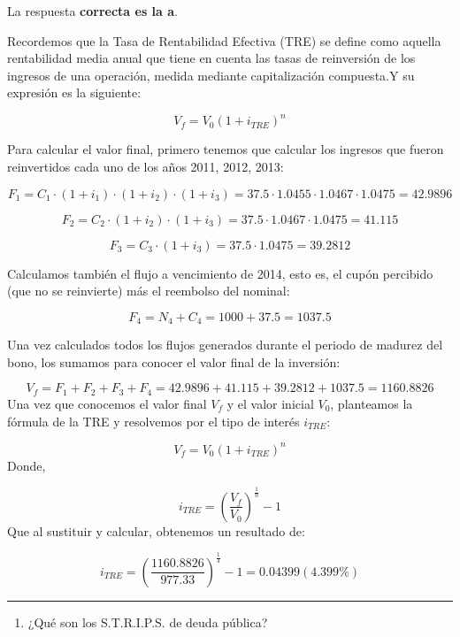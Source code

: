 \documentclass[
  letterpaper,
  DIV=11,
  numbers=noendperiod]{scrreprt}
\providecommand{\tightlist}{%
  \setlength{\itemsep}{0pt}\setlength{\parskip}{0pt}}\usepackage{longtable,booktabs,array}
\begin{document}
\begin{tcolorbox}
\begin{tcolorbox}[enhanced jigsaw, toprule=.15mm, left=2mm, arc=.35mm, breakable, bottomrule=.15mm, opacityback=0, rightrule=.15mm, leftrule=.75mm, colframe=quarto-callout-note-color-frame, colback=white]
\begin{minipage}[t]{\textwidth - 5.5mm}
La respuesta \textbf{correcta es la a}.

Recordemos que la Tasa de Rentabilidad Efectiva (TRE) se define como
aquella rentabilidad media anual que tiene en cuenta las tasas de
reinversión de los ingresos de una operación, medida mediante
capitalización compuesta.Y su expresión es la siguiente:

\[V_f=V_0\left(1+i_{TRE}\right)^n\]

Para calcular el valor final, primero tenemos que calcular los ingresos
que fueron reinvertidos cada uno de los años 2011, 2012, 2013:

\[F_1=C_1\cdot\left(1+i_1\right)\cdot\left(1+i_2\right)\cdot\left(1+i_3\right)=37.5\cdot1.0455\cdot1.0467\cdot1.0475=42.9896\]

\[F_2=C_2\cdot\left(1+i_2\right)\cdot\left(1+i_3\right)=37.5\cdot1.0467\cdot1.0475=41.115\]

\[F_3=C_3\cdot\left(1+i_3\right)=37.5\cdot1.0475=39.2812\]

Calculamos también el flujo a vencimiento de 2014, esto es, el cupón
percibido (que no se reinvierte) más el reembolso del nominal:

\[F_4=N_4+C_4=1000+37.5=1037.5\]

Una vez calculados todos los flujos generados durante el periodo de
madurez del bono, los sumamos para conocer el valor final de la
inversión:

\[V_f=F_1+F_2+F_3+F_4=42.9896+41.115+39.2812+1037.5=1160.8826\] Una vez
que conocemos el valor final \(V_f\) y el valor inicial \(V_0\),
planteamos la fórmula de la TRE y resolvemos por el tipo de interés
\(i_{TRE}\):

\[V_f=V_0\left(1+i_{TRE}\right)^n\] Donde,

\[i_{TRE}=\left(\frac{V_f }{V_0 }\right)^{\frac{1 }{n }}-1\] Que al
sustituir y calcular, obtenemos un resultado de:

\[i_{TRE}=\left(\frac{ 1160.8826}{977.33 }\right)^{\frac{1 }{4 }}-1=0.04399(4.399\%)\]

\end{minipage}%
\end{tcolorbox}

\begin{center}\rule{0.5\linewidth}{0.5pt}\end{center}

\begin{enumerate}
\def\labelenumi{\arabic{enumi}.}
\setcounter{enumi}{10}
\tightlist
\item
  ¿Qué son los S.T.R.I.P.S. de deuda pública?
\end{enumerate}


\end{tcolorbox}
\end{document}
